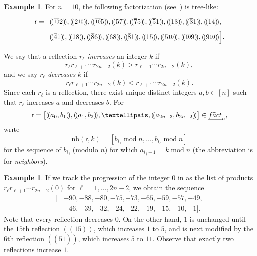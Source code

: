 \documentclass[a4paper,10pt,leqno]{amsart}
\newcommand{\darkred}{\color{darkred}}
\numberwithin{equation}{section}
\theoremstyle{definition}
\newtheorem{example}[theorem]{Example}
\theoremstyle{remark}
\newcommand{\Ft}{\textsc{f}\widetilde{\textsc{a}}\textsc{ct}}
\newcommand{\EFt}{\underline{\Ft}}
\renewcommand{\mod}{\;\mathrm{mod}\;}
\newcommand{\rr}{\mathsf{r}}
\newcommand{\rrk}[1][k]{\mathrm{nb}(\rr,#1)}
\newcommand{\rrr}{r}
\newcommand{\defn}[1]{\emph{\darkred #1}}
\newcommand\ten{\raisebox{.15\height}{\scalebox{.8}{10}}}
\newcounter{intege}
\begin{document}
\begin{example}\label{ex1}
For $n=10$, the following factorization (see~) is tree-like:
\begin{align*}\rr=\Big[ &(\!(\overline{\ten} 2)\!),(\!(2\ten)\!),(\!(\overline{\ten} 5)\!),(\!(57)\!),(\!(\overline{7} 5)\!),(\!(\overline{5} 1)\!),(\!(13)\!),(\!(\overline{3} 1)\!),(\!(14)\!),\\ &(\!(\overline{4} 1)\!),(\!(18)\!),(\!(\overline{8} 6)\!),(\!(68)\!),(\!(\overline{8} 1)\!),(\!(15)\!),(\!(5\ten)\!),(\!(\overline{\ten} 9)\!),(\!(9\ten)\!)\Big].\end{align*}
\end{example}

We say that a reflection $\rrr_\ell$ \defn{increases} an integer $k$ if
    \[
        \rrr_\ell \rrr_{\ell + 1} \cdots \rrr_{2n-2}(k) > \rrr_{\ell + 1} \cdots \rrr_{2n-2}(k),
    \]
    and we say $\rrr_\ell$ \defn{decreases} $k$ if
    \[
        \rrr_\ell \rrr_{\ell + 1} \cdots \rrr_{2n-2}(k) < \rrr_{\ell + 1} \cdots \rrr_{2n-2}(k).
    \]
    Since each $\rrr_\ell$ is a reflection, there exist unique distinct integers $a , b \in [n]$ such that $\rrr_\ell$ increases $a$ and decreases $b$.  For \[\rr =  \big[(\!(a_{0}, b_1)\!), (\!(a_{1}, b_2)\!),\ldots, (\!(a_{2n-3}, b_{2n-2})\!)\big] \in \EFt_n,\] write
\begin{equation}
\label{eq:nb}
\rrk=[b_{i_1}\mod n,\ldots,b_{i_\ell}\mod n]
\end{equation}
for the sequence of $b_{i_j}$ (modulo $n$) for which $a_{i_j-1}=k \mod n$ (the abbreviation is for \emph{neighbors}).

\begin{example}
\label{ex:progression}
If we track the progression of the integer $0$ in  as the list of products $\rrr_\ell \rrr_{\ell+1} \cdots \rrr_{2n-2}(0)$ for $\ell=1,\ldots,2n-2$, we obtain the sequence
\begin{align*}\big[&-90,-88,-80,-75,-73,-65,-59,-57,-49,\\&-46,-39,-32,-24,-22,-19,-15,-10,-1\big].\end{align*}
Note that every reflection decreases $0$.   On the other hand, $1$ is unchanged until the $15$th reflection $(\!(15)\!)$, which increases $1$ to $5$, and is next modified by the $6$th reflection $(\!(\overline{5}1)\!)$, which increases $5$ to $11$.  Observe that exactly two reflections increase $1$.%
\end{example}
\end{document}
